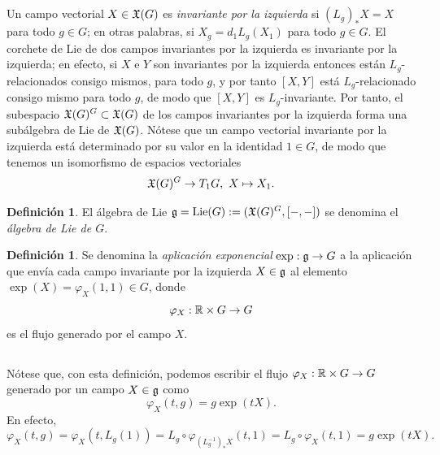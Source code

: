 \documentclass[11pt,a4paper]{amsbook}
\theoremstyle{remark} \newtheorem{rmk}[subsection]{Observación}
\theoremstyle{definition} \newtheorem{defn}[subsection]{Definición}
\theoremstyle{definition} \newtheorem{ex}[subsection]{Ejemplo}
\theoremstyle{definition} \newtheorem{ej}[subsection]{Ejercicio}
\begin{document}
\subsection{}
Un campo vectorial $X\in \mathfrak X(G)$ es \emph{invariante por la izquierda} si $(L_g)_* X = X$ para todo $g\in G$; en otras palabras, si $X_g = d_1L_g(X_1)$ para todo $g\in G$. El corchete de Lie de dos campos invariantes por la izquierda es invariante por la izquierda; en efecto, si $X$ e $Y$ son invariantes por la izquierda entonces están $L_g$-relacionados consigo mismos, para todo $g$, y por tanto $[X,Y]$ está $L_g$-relacionado consigo mismo para todo $g$, de modo que $[X,Y]$ es $L_g$-invariante. Por tanto, el subespacio $\mathfrak X(G)^G\subset \mathfrak X(G)$ de los campos invariantes por la izquierda forma una subálgebra de Lie de $\mathfrak X(G)$. Nótese que un campo vectorial invariante por la izquierda está determinado por su valor en la identidad $1\in G$, de modo que tenemos un isomorfismo de espacios vectoriales
\begin{equation*}
\mathfrak X(G)^G \rightarrow T_1 G, \ X\mapsto X_1.
\end{equation*}

\begin{defn}
El álgebra de Lie $\mathfrak{g}=\mathrm{Lie}(G):=(\mathfrak X(G)^G,[-,-])$ se denomina el \emph{álgebra de Lie de $G$}.
\end{defn}

\begin{defn}
  Se denomina la \emph{aplicación exponencial} $\exp:\mathfrak{g} \rightarrow G$ a la aplicación que envía cada campo invariante por la izquierda $X\in \mathfrak{g}$ al elemento $\exp(X)=\varphi_X(1,1)\in G$, donde
  \begin{equation*}
\varphi_X: \mathbb R \times G \rightarrow G
  \end{equation*}
es el flujo generado por el campo $X$.
\end{defn}

\subsection{} Nótese que, con esta definición, podemos escribir el flujo $\varphi_X:\mathbb R \times G \rightarrow G$ generado por un campo $X\in \mathfrak{g}$ como
\begin{equation*}
\varphi_X(t,g) = g \exp(tX).
\end{equation*}
En efecto,
\begin{equation*}
\varphi_X(t,g) = \varphi_X(t,L_g(1)) = L_g \circ \varphi_{(L_g^{-1})_* X} (t,1) = L_g \circ \varphi_X(t,1) = g \exp(tX).
\end{equation*}
\end{document}
